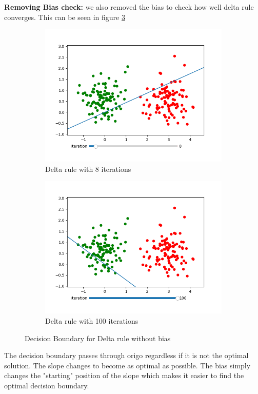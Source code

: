 \documentclass[a4paper]{article}
\begin{document}
\textbf{Removing Bias check: }we also removed the bias to check how well delta rule converges. This can be seen in figure \ref{fig:DeltaRule-NoBias}
\begin{figure}[htb]
    \centering
    \begin{subfigure}{0.4\textwidth}
        \includegraphics[width=\textwidth]{Labs/Lab 1/Lab 1a/Results/Delta-linear-seperable-NO-BIAS.png}
        \caption{Delta rule with 8 iterations}
        \label{fig:Delta Rule without bias, iteration 8}
    \end{subfigure}
    \hfill
    \begin{subfigure}{0.4\textwidth}
        \includegraphics[width=\textwidth]{Labs/Lab 1/Lab 1a/Results/Delta-linear-seperable-NO-BIAS-ITERATION100.png}
        \caption{Delta rule with 100 iterations}
        \label{fig:Perceptron}
    \end{subfigure}
    \caption{Decision Boundary for Delta rule without bias }
    \label{fig:DeltaRule-NoBias}
\end{figure}
The decision boundary passes through origo regardless if it is not the optimal solution. The slope changes to become as optimal as possible. The bias simply changes the "starting" position of the slope which makes it easier to find the optimal decision boundary. 
\end{document}
